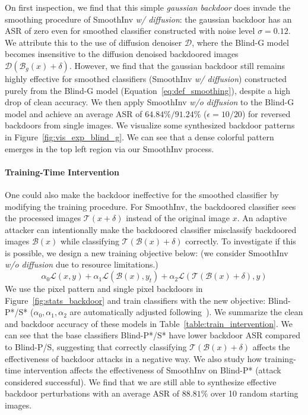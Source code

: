 \documentclass[10pt,twocolumn,letterpaper]{article}
\begin{document}
On first inspection, we find that this simple \textit{gaussian backdoor} does invade the smoothing procedure of SmoothInv \textit{w/ diffusion}: 
the gaussian backdoor has an ASR of zero even for smoothed classifier constructed with noise level $\sigma=0.12$. We attribute this to the use of diffusion denoiser $\mathcal{D}$, where the Blind-G model becomes insensitive to the diffusion denoised backdoored images $\mathcal{D}(\mathcal{B}_{g}(x)+\delta)$. However, we find that the gaussian backdoor still remains highly effective for smoothed classifiers (SmoothInv \textit{w/ diffusion}) constructed purely from the Blind-G model (Equation~\ref{eq:def_smoothing}), despite a high drop of clean accuracy. We then apply SmoothInv \textit{w/o diffusion} to the Blind-G model and achieve an average ASR of $64.84\%/91.24\%$ ($\epsilon=10/20$) for reversed backdoors from single images. We visualize some synthesized backdoor patterns in Figure~\ref{fig:vis_exp_blind_g}. We can see that a dense colorful pattern emerges in the top left region via our SmoothInv process.

\paragraph{Training-Time Intervention} One  could also make the backdoor ineffective for the smoothed classifier by modifying the training procedure. For SmoothInv, the backdoored classifier sees the processed images $\mathcal{T}(x+\delta)$ instead of the original image $x$. An adaptive attacker can intentionally make the backdoored classifier misclassify backdoored images $\mathcal{B}(x)$ while classifying $\mathcal{T}(\mathcal{B}(x)+\delta)$ correctly. To investigate if this is possible, we design a new training objective below: (we consider SmoothInv \textit{w/o diffusion} due to resource limitations.)
\begin{equation}\label{eq:new_loss}
  \alpha_{0}\mathcal{L}(x,y)+\alpha_{1}\mathcal{L}(\mathcal{B}(x),y_{t})+\alpha_{2}\mathcal{L}(\mathcal{T}(\mathcal{B}(x)+\delta),y)
\end{equation}
We use the pixel pattern and single pixel backdoors in Figure~\ref{fig:stats_backdoor} and train classifiers with the new objective: Blind-P*/S* ($\alpha_{0},\alpha_{1},\alpha_{2}$ are automatically adjusted following~\cite{bagdasaryan2020blind}). We summarize the clean and backdoor accuracy of these models in Table~\ref{table:train_intervention}. We can see that the base classifiers Blind-P*/S* have lower backdoor ASR compared to Blind-P/S, suggesting that correctly classifying $\mathcal{T}(\mathcal{B}(x)+\delta)$ affects the effectiveness of backdoor attacks in a negative way. We also study how training-time intervention affects the effectiveness of SmoothInv on Blind-P* (attack considered successful). We find that we are still able to synthesize effective backdoor perturbations with an average ASR of $88.81\%$ over 10 random starting images. 
\end{document}
